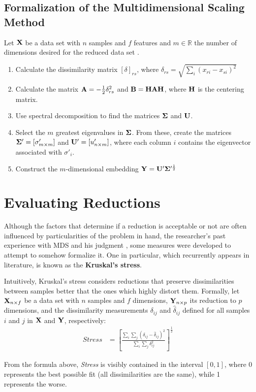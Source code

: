 \subsection{Formalization of the Multidimensional Scaling Method}

Let $\mathbf{X}$ be a data set with $n$ samples and $f$ features and $m\in\mathbb{R}$ the number of dimensions desired for the reduced data set \cite{cox2001}.

\begin{enumerate}
	\item Calculate the dissimilarity matrix $[\delta]_{rs}$, where $\delta_{rs} = \sqrt{\sum_i (x_{ri} - x_{si})^2}$
	\item Calculate the matrix $\mathbf{A}=-\frac{1}{2}\delta_{rs}^2$ and $\mathbf{B=HAH}$, where $\mathbf{H}$ is the centering matrix.

	\item Use spectral decomposition to find the matrices $\mathbf{\Sigma}$ and $\mathbf{U}$.

	\item Select the $m$ greatest eigenvalues in $\mathbf{\Sigma}$. From these, create the matrices $\mathbf{\Sigma}'=[\sigma'_{m\times m}]$ and $\mathbf{U}'=[u'_{n\times m}]$, where each column $i$ contains the eigenvector associated with $\sigma'_i$.

	\item Construct the $m$-dimensional embedding $\mathbf{Y}=\mathbf{U}'\mathbf{\Sigma}'^{\frac{1}{2}}$
\end{enumerate}

\section{Evaluating Reductions}

Although the factors that determine if a reduction is acceptable or not are often influenced by particularities of the problem in hand, the researcher's past experience with MDS and his judgment \cite{naes1996multivariate}, some measures were developed to attempt to somehow formalize it. One in particular, which recurrently appears in literature, is known as the \textbf{Kruskal's stress}.

Intuitively, Kruskal's stress \cite{naes1996multivariate} considers reductions that preserve dissimilarities between samples better that the ones which highly distort them. Formally, let $\mathbf{X}_{n \times f}$ be a data set with $n$ samples and $f$ dimensions, $\mathbf{Y}_{n \times p}$ its reduction to $p$ dimensions, and the dissimilarity measurements $\delta_{ij}$ and $\hat{\delta}_{ij}$ defined for all samples $i$ and $j$ in $\mathbf{X}$ and $\mathbf{Y}$, respectively:
\begin{align*}
	Stress &= [\frac{\sum_i \sum_j (\delta_{ij} - \hat{\delta}_{ij})^2}{\sum_i \sum_j \delta_{ij}^2}]^{\frac{1}{2}}
\end{align*}

From the formula above, {\em Stress} is visibly contained in the interval $[0, 1]$, where 0 represents the best possible fit (all dissimilarities are the same), while 1 represents the worse.
